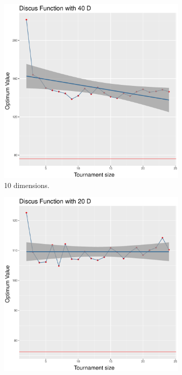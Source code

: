 \begin{figure}[t]
	\begin{subfigure}[b]{0.33\textwidth}
		\centering
		\includegraphics[width=\textwidth]{img/unimodal_uniform_11_dim_40.pdf}
		\caption{10 dimensions.}
	\end{subfigure}
	\begin{subfigure}[b]{0.33\textwidth}
		\centering
		\includegraphics[width=\textwidth]{img/unimodal_uniform_11_dim_20.pdf}

\end{subfigure}
\end{figure}
